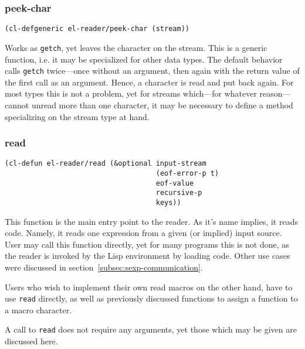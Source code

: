 \documentclass[a4paper,10pt,twoside]{report}
\newcommand{\fun}[1]{\texttt{#1}}
\newcommand{\Read}{\fun{read}}
\begin{document}
\subsubsection{peek-char}
\label{subsubsec:peek-char}

\begin{lstlisting}[style=lispinline]
(cl-defgeneric el-reader/peek-char (stream))
\end{lstlisting}

Works as \fun{getch}, yet leaves the character on the stream.  This is a generic
function, i.e. it may be specialized for other data types.  The default behavior
calls \fun{getch} twice---once without an argument, then again with the return
value of the first call as an argument.  Hence, a character is read and put back
again.  For most types this is not a problem, yet for streams which---for
whatever reason---cannot unread more than one character, it may be necessary to
define a method specializing on the stream type at hand.

\subsubsection{read}
\label{subsubsec:read}

\begin{lstlisting}[style=lispinline]
(cl-defun el-reader/read (&optional input-stream
                                    (eof-error-p t)
                                    eof-value
                                    recursive-p
                                    keys))
\end{lstlisting}

This function is the main entry point to the reader.  As it’s name implies, it
reads code.  Namely, it reads one expression from a given (or implied) input
source.  User may call this function directly, yet for many programs this is not
done, as the reader is invoked by the Lisp environment by loading code.  Other
use cases were discussed in section~\ref{subsec:sexp-communication}.

Users who wish to implement their own read macros on the other hand, have to use
\Read{} directly, as well as previously discussed functions to assign a function
to a macro character.

A call to \Read{} does not require any arguments, yet those which may be given
are discussed here.
\end{document}

